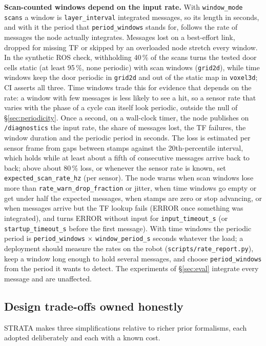 \documentclass[conference]{IEEEtran}
\begin{document}
\textbf{Scan-counted windows depend on the input rate.} With
\texttt{window\_mode} \texttt{scans} a window is \texttt{layer\_interval}
integrated messages, so its length in seconds, and with it the period that
\texttt{period\_windows} stands for, follows the rate of messages the node
actually integrates. Messages lost on a best-effort link, dropped for missing TF
or skipped by an overloaded node stretch every window. In the synthetic ROS
check, withholding 40\,\% of the scans turns the tested door cells static (at least 95\,\%, none periodic) with scan windows (\texttt{grid2d}), while time windows keep the door periodic in
\texttt{grid2d} and out of the static map in \texttt{voxel3d}; CI asserts all
three. Time windows trade this for evidence that depends on the rate: a window
with few messages is less likely to see a hit, so a sensor rate that varies with
the phase of a cycle can itself look periodic, outside the null of
\S\ref{sec:periodicity}. Once a second, on a wall-clock timer, the node
publishes on \texttt{/diagnostics} the input rate, the share of messages lost,
the TF failures, the window duration and the periodic period in seconds. The
loss is estimated per sensor frame from gaps between stamps against the
20th-percentile interval, which holds while at least about a fifth of
consecutive messages arrive back to back; above about 80\,\% loss, or whenever
the sensor rate is known, set \texttt{expected\_scan\_rate\_hz} (per sensor).
The node warns when scan windows lose more than \texttt{rate\_warn\_drop\_fraction}
or jitter, when time windows go empty or get under half the expected messages,
when stamps are zero or stop advancing, or when messages arrive but the TF lookup fails (ERROR once something was integrated), and turns ERROR without input for \texttt{input\_timeout\_s} (or
\texttt{startup\_timeout\_s} before the first message). With time windows the
periodic period is \texttt{period\_windows} $\times$ \texttt{window\_period\_s}
seconds whatever the load; a deployment should measure the rates on the robot
(\texttt{scripts/rate\_report.py}), keep a window long enough to hold several
messages, and choose \texttt{period\_windows} from the period it wants to
detect. The experiments of
\S\ref{sec:eval} integrate every message and are unaffected.

\subsection{Design trade-offs owned honestly}

STRATA makes three simplifications relative to richer prior formalisms,
each adopted deliberately and each with a known cost.
\end{document}
